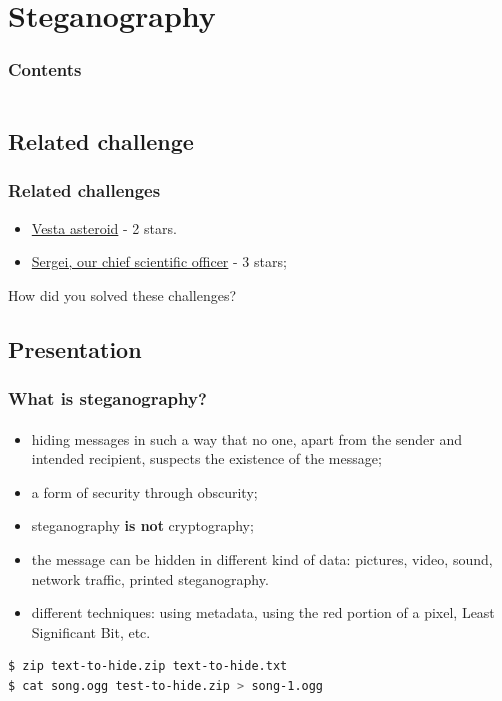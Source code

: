 \documentclass[]{beamer}
\begin{document}
%
%
\section{Steganography}
\begin{frame}
    \frametitle{Contents}
    \begin{columns}[t]
        \begin{column}{5cm}
            \tableofcontents[sections={1-3}, currentsection, hideothersubsections]
        \end{column}
        \begin{column}{5cm}
            \tableofcontents[sections={4-5}, currentsection, hideothersubsections]
        \end{column}
    \end{columns}
\end{frame}
\subsection{Related challenge}
\begin{frame}
\frametitle{Related challenges}
\begin{itemize}
    \item \href{https://github.com/cscluxembourg/vestatech/blob/master/challenges/Vesta-asteroid/vesta.png}{Vesta asteroid} - 2 stars.
    \item \href{https://github.com/cscluxembourg/vestatech/blob/master/challenges/sergei/Sergei.png}{Sergei, our chief scientific officer} - 3 stars;
\end{itemize}
\bigskip
How did you solved these challenges?
\end{frame}

\subsection{Presentation}
\begin{frame}[fragile]
\frametitle{What is steganography?}
\framesubtitle{}
\begin{itemize}
    \item hiding messages in such a way that no one, apart from the sender and intended recipient, suspects the existence of the message;
    \item a form of security through obscurity;
    \item steganography \textbf{is not} cryptography;
    \item the message can be hidden in different kind of data: pictures, video, sound, network traffic, printed steganography.
    \item different techniques: using metadata, using the red portion of a pixel, Least Significant Bit, etc.
\end{itemize}
\begin{lstlisting}[language=Bash]
$ zip text-to-hide.zip text-to-hide.txt
$ cat song.ogg test-to-hide.zip > song-1.ogg
\end{lstlisting}
\end{frame}
\end{document}
